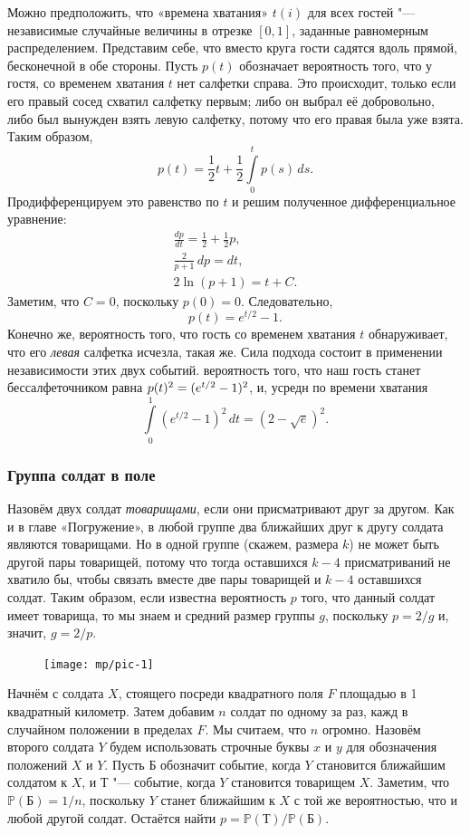 \documentclass[twoside]{book}
\begin{document}
Можно предположить, что «времена хватания» $t(i)$ для всех гостей "--- независимые случайные величины в отрезке $[0,1]$, заданные равномерным распределением.
Представим себе, что вместо круга гости садятся вдоль прямой, бесконечной в обе стороны.
Пусть $p(t)$ обозначает вероятность того, что у гостя, со временем хватания $t$ нет салфетки справа.
Это происходит, только если его правый сосед схватил салфетку первым;
либо он выбрал её добровольно,
либо был вынужден взять левую салфетку, потому что его правая была уже взята.
Таким образом,
\[p(t)=\frac12t+\frac12\int\limits_0^tp(s)\,ds.\]
Продифференцируем это равенство по $t$ и решим полученное дифференциальное уравнение:
\begin{gather*}
\frac{dp}{dt}=\frac12+\frac12p,
\\
\frac2{p+1}\,dp=dt,
\\
2\ln(p+1)=t+C.
\end{gather*}
Заметим, что $C=0$, поскольку $p(0)=0$.
Следовательно,
\[p(t) = e^{t/2} - 1.\]
Конечно же, вероятность того, что гость со временем хватания $t$ обнаруживает, что его \emph{левая} салфетка исчезла, такая же.
Сила подхода состоит в применении независимости этих двух событий.
 вероятность того, что наш гость станет бессалфеточником равна $p(t)^2 \z= (e^{t/2} -1)^2$, и, усредн по времени хватания
\[\int\limits_0^1(e^{t/2}-1)^2\,dt=(2-\sqrt{e})^2.\]
\heartf

\subsubsection*{Группа солдат в поле}

Назовём двух солдат \emph{товарищами}, если они присматривают друг за другом.
Как и в главе «Погружение», в любой группе два ближайших друг к другу солдата являются товарищами.
Но в одной группе (скажем, размера $k$) не может быть другой пары товарищей, потому что тогда оставшихся $k-4$ присматриваний не хватило бы, чтобы связать вместе две пары товарищей и $k-4$ оставшихся солдат.
Таким образом, если известна вероятность $p$ того, что данный солдат имеет товарища, то мы знаем и средний размер группы $g$, поскольку $p = 2/g$ и, значит, $g = 2/p$.

\begin{figure}[!ht]
\centering
\texttt{[image: mp/pic-1]} %
\end{figure}

Начнём с солдата $X$, стоящего посреди квадратного поля $F$ площадью в 1 квадратный километр.
Затем добавим $n$ солдат по одному за раз, кажд в случайном положении в пределах $F$. 
Мы считаем, что $n$ огромно.
Назовём второго солдата $Y$ будем использовать строчные буквы $x$ и $y$ для обозначения положений $X$ и $Y$.
Пусть $\text{Б}$ обозначит событие, когда $Y$ становится ближайшим солдатом к $X$, 
и $\text{Т}$ "--- событие, когда $Y$ становится товарищем $X$.
Заметим, что $\mathbb{P}(\text{Б})=1/n$, поскольку $Y$ станет ближайшим к $X$ с той же вероятностью, что и любой другой солдат.
Остаётся найти $p=\mathbb{P}(\text{Т})/\mathbb{P}(\text{Б})$.
\end{document}
